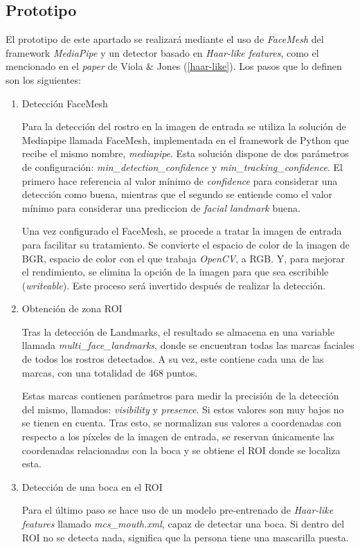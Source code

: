 \vspace{-0.8cm}
\subsection*{Prototipo}
\vspace{-0.5cm}
El prototipo de este apartado se realizará mediante el uso de \textit{FaceMesh} del framework \textit{MediaPipe} y un detector basado en \textit{Haar-like features}, como el mencionado en el \textit{paper} de Viola \& Jones (\ref{haar-like}). Los pasos que lo definen son los siguientes:

\begin{enumerate}
	\item Detección FaceMesh
	
	Para la detección del rostro en la imagen de entrada se utiliza la solución de Mediapipe llamada FaceMesh, implementada en el framework de Python que recibe el mismo nombre, \textit{mediapipe}. Esta solución dispone de dos parámetros de configuración: \textit{min\_detection\_confidence} y \textit{min\_tracking\_confidence}. El primero hace referencia al valor mínimo de \textit{confidence} para considerar una detección como buena, mientras que el segundo se entiende como el valor mínimo para considerar una prediccion de \textit{facial landmark} buena.
	
	Una vez configurado el FaceMesh, se procede a tratar la imagen de entrada para facilitar su tratamiento. Se convierte el espacio de color de la imagen de BGR, espacio de color con el que trabaja \textit{OpenCV}, a RGB. Y, para mejorar el rendimiento, se elimina la opción de la imagen para que sea escribible (\textit{writeable}). Este proceso será invertido después de realizar la detección.
	
	\item Obtención de zona ROI
	
	Tras la detección de Landmarks, el resultado se almacena en una variable llamada \textit{multi\_face\_landmarks}, donde se encuentran todas las marcas faciales de todos los rostros detectados. A su vez, este contiene cada una de las marcas, con una totalidad de 468 puntos.

	Estas marcas contienen parámetros para medir la precisión de la detección del mismo, llamados: \textit{visibility} y \textit{presence}. Si estos valores son muy bajos no se tienen en cuenta. Tras esto, se normalizan sus valores a coordenadas con respecto a los píxeles de la imagen de entrada, se reservan únicamente las coordenadas relacionadas con la boca y se obtiene el ROI donde se localiza esta.
	
	\item Detección de una boca en el ROI 
	
	Para el último paso se hace uso de un modelo pre-entrenado de \textit{Haar-like features} llamado \textit{mcs\_mouth.xml}, capaz de detectar una boca. Si dentro del ROI no se detecta nada, significa que la persona tiene una mascarilla puesta.
\end{enumerate}

